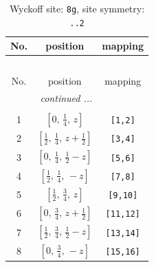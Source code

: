 \documentclass[fleqn,8pt]{jsarticle}
\begin{document}
\begin{longtable}{ccc}
\caption{Wyckoff site: {\tt 8g}, site symmetry: {\tt ..2}}
 \\
 \hline \hline
No. & position & mapping \\ \hline \endfirsthead

\multicolumn{2}{l}{\tablename\ \thetable{}} \\
 \hline \hline
No. & position & mapping \\ \hline \endhead

 \hline \hline
\multicolumn{2}{r}{\footnotesize\it continued ...} \\ \endfoot

 \hline \hline
\multicolumn{2}{r}{} \\ \endlastfoot

1 & $\left[ 0,\, \frac{1}{4},\, z \right]$ & {\tt [1,2]} \\ \hline
2 & $\left[ \frac{1}{2},\, \frac{1}{4},\, z + \frac{1}{2} \right]$ & {\tt [3,4]} \\ \hline
3 & $\left[ 0,\, \frac{1}{4},\, \frac{1}{2} - z \right]$ & {\tt [5,6]} \\ \hline
4 & $\left[ \frac{1}{2},\, \frac{1}{4},\, - z \right]$ & {\tt [7,8]} \\ \hline
5 & $\left[ \frac{1}{2},\, \frac{3}{4},\, z \right]$ & {\tt [9,10]} \\ \hline
6 & $\left[ 0,\, \frac{3}{4},\, z + \frac{1}{2} \right]$ & {\tt [11,12]} \\ \hline
7 & $\left[ \frac{1}{2},\, \frac{3}{4},\, \frac{1}{2} - z \right]$ & {\tt [13,14]} \\ \hline
8 & $\left[ 0,\, \frac{3}{4},\, - z \right]$ & {\tt [15,16]} \\
\end{longtable}
\renewcommand{\arraystretch}{1.2}
\end{document}
